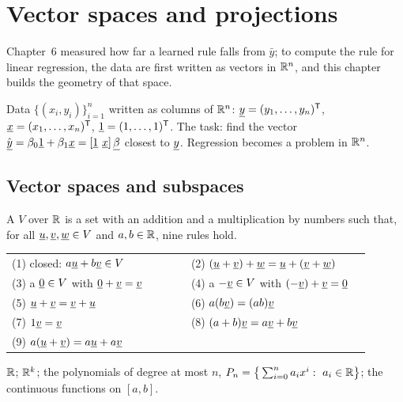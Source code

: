 \chapter{Vector spaces and projections}

Chapter~6 measured how far a learned rule falls from $\bar y$; to compute the rule for linear regression, the data are first written as vectors in $\mathbb{R}^n$, and this chapter builds the geometry of that space.

\begin{setup}
Data $\{(x_i,y_i)\}_{i=1}^n$ written as columns of $\mathbb{R}^n$: $\underline{y}=(y_1,\dots,y_n)^{\mathsf{T}}$, $\underline{x}=(x_1,\dots,x_n)^{\mathsf{T}}$, $\underline{1}=(1,\dots,1)^{\mathsf{T}}$. The task: find the vector $\hat{\vect y}=\beta_0\vect{1}+\beta_1\vect{x}=[\vect{1}\ \vect{x}]\,\vect{\beta}$ closest to $\underline{y}$. Regression becomes a problem in $\mathbb{R}^n$.
\end{setup}

\section{Vector spaces and subspaces}

\begin{definition}
A  $V$ over $\mathbb{R}$ is a set with an addition and a multiplication by numbers such that, for all $\underline{u},\underline{v},\underline{w}\in V$ and $a,b\in\mathbb{R}$, nine rules hold.
\begin{center}
\small
\begin{tabular}{@{}p{0.47\linewidth}p{0.47\linewidth}@{}}
(1) closed: $a\underline{u}+b\underline{v}\in V$ & (2) $(\underline{u}+\underline{v})+\underline{w}=\underline{u}+(\underline{v}+\underline{w})$\\
(3) a $\underline{0}\in V$ with $\underline{0}+\underline{v}=\underline{v}$ & (4) a $-\underline{v}\in V$ with $(-\underline{v})+\underline{v}=\underline{0}$\\
(5) $\underline{u}+\underline{v}=\underline{v}+\underline{u}$ & (6) $a(b\underline{v})=(ab)\underline{v}$\\
(7) $1\underline{v}=\underline{v}$ & (8) $(a+b)\underline{v}=a\underline{v}+b\underline{v}$\\
(9) $a(\underline{u}+\underline{v})=a\underline{u}+a\underline{v}$ & \\
\end{tabular}
\end{center}
\end{definition}

\begin{example}
$\mathbb{R}$; $\mathbb{R}^k$; the polynomials of degree at most $n$, $P_n=\big\{\sum_{i=0}^na_ix^i:\ a_i\in\R\big\}$; the continuous functions on $[a,b]$.
\end{example}

